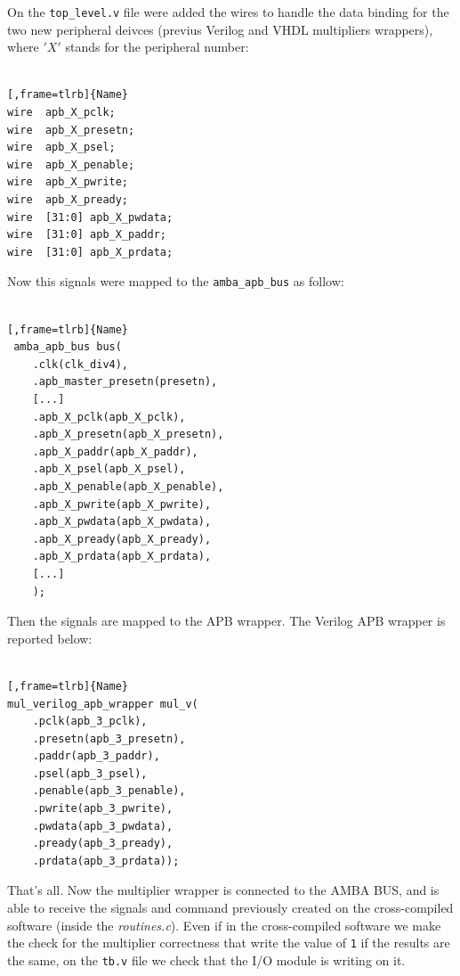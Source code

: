 \documentclass[]{IEEEtran}
\begin{document}
On the \verb|top_level.v| file were added the wires to handle the data binding for the two new peripheral deivces (previus Verilog and VHDL multipliers wrappers), where $'X'$ stands for the peripheral number:
\\
\\
\noindent
\begin{minipage}{.45\textwidth}
	\begin{lstlisting}[,frame=tlrb]{Name}
wire  apb_X_pclk;
wire  apb_X_presetn;
wire  apb_X_psel;
wire  apb_X_penable;
wire  apb_X_pwrite;
wire  apb_X_pready;
wire  [31:0] apb_X_pwdata;
wire  [31:0] apb_X_paddr;
wire  [31:0] apb_X_prdata;
	\end{lstlisting}
\end{minipage}\hfill
Now this signals were mapped to the \verb|amba_apb_bus| as follow:
\\
\\
\noindent
\begin{minipage}{.45\textwidth}
	\begin{lstlisting}[,frame=tlrb]{Name}
 amba_apb_bus bus(  
 	.clk(clk_div4),
	.apb_master_presetn(presetn),
	[...]
	.apb_X_pclk(apb_X_pclk),
	.apb_X_presetn(apb_X_presetn),
	.apb_X_paddr(apb_X_paddr),
	.apb_X_psel(apb_X_psel),
	.apb_X_penable(apb_X_penable),
	.apb_X_pwrite(apb_X_pwrite),
	.apb_X_pwdata(apb_X_pwdata),
	.apb_X_pready(apb_X_pready),
	.apb_X_prdata(apb_X_prdata),
	[...]
    );
	\end{lstlisting}
\end{minipage}\hfill
Then the signals are mapped to the APB wrapper. The Verilog APB wrapper is reported below:
\\
\\
\noindent
\begin{minipage}{.45\textwidth}
	\begin{lstlisting}[,frame=tlrb]{Name}
mul_verilog_apb_wrapper mul_v(  
	.pclk(apb_3_pclk),
	.presetn(apb_3_presetn),
	.paddr(apb_3_paddr),
	.psel(apb_3_psel),
	.penable(apb_3_penable),
	.pwrite(apb_3_pwrite),  
	.pwdata(apb_3_pwdata),
	.pready(apb_3_pready),
	.prdata(apb_3_prdata));
	\end{lstlisting}
\end{minipage}\hfill
That's all. Now the multiplier wrapper is connected to the AMBA BUS, and is able to receive the signals and command previously created on the cross-compiled software (inside the \textit{routines.c}). Even if in the cross-compiled software we make the check for the multiplier correctness that write the value of \verb|1| if the results are the same, on the \verb|tb.v| file we check that the I/O module is writing on it.
\end{document}

